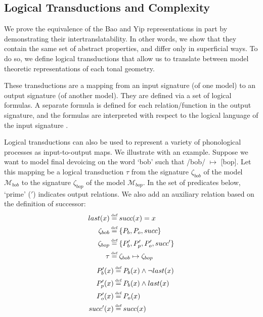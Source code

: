 \documentclass{article}
\newcommand\myeq{\mathrel{\stackrel{\makebox[0pt]{\mbox{\normalfont\tiny def}}}{=}}}
\begin{document}
\subsection{Logical Transductions and Complexity}
We prove the equivalence of the Bao and Yip representations in part by demonstrating their intertranslatability. In other words, we show that they contain the same set of abstract properties, and differ only in superficial ways. To do so, we define logical transductions that allow us to translate between model theoretic representations of each tonal geometry. \par
These transductions are a mapping from an input signature (of one model) to an output signature (of another model). They are defined via a set of logical formulas. A separate formula is defined for each relation/function in the output signature, and the formulas are interpreted with respect to the logical language of the input signature \citep{Courcelle1994, EngHoo2001}. \par
Logical transductions can also be used to represent a variety of phonological processes as input-to-output maps. We illustrate with an example. Suppose we want to model final devoicing on the word `bob' such that /bob/ $\mapsto$ [bop]. Let this mapping be a logical transduction $\tau$ from the signature $\zeta_{bob}$ of the model $\mathcal{M}_{bob}$ to the signature $\zeta_{bop}$ of the model $\mathcal{M}_{bop}$. In the set of predicates below, `prime' ($'$) indicates output relations. We also add an auxiliary relation based on the definition of successor:
\begin{equation}
\begin{aligned}
last(x) &\myeq succ(x)=x\\
\zeta_{bob}&\myeq \{P_{b}, P_{o},succ\} \\
\zeta_{bop}&\myeq \{P'_{b}, P'_{p}, P'_{o},succ'\} \\
\tau&\myeq \zeta_{bob} \mapsto \zeta_{bop} \\
\end{aligned}
\end{equation}
\begin{equation}
\begin{aligned}
P'_{b}(x)&\myeq P_{b}(x) \land \neg last(x) \\
P'_{p}(x)&\myeq P_{b}(x) \land last(x)\\
P'_{o}(x)&\myeq P_{o}(x) \\
succ'(x) &\myeq succ(x) \\
\end{aligned}
\end{equation}
\end{document}

